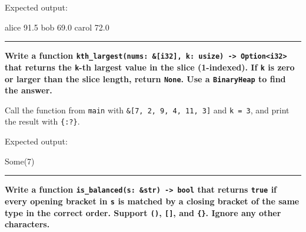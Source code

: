 \documentclass[
  11pt,
]{article}
\newenvironment{Shaded}{}{}
\newcommand{\NormalTok}[1]{#1}
\begin{document}
Expected output:

\begin{Shaded}
\begin{Highlighting}[]
\NormalTok{alice 91.5}
\NormalTok{bob 69.0}
\NormalTok{carol 72.0}
\end{Highlighting}
\end{Shaded}

\begin{Shaded}
\begin{Highlighting}[]


\end{Highlighting}
\end{Shaded}

\begin{center}\rule{0.5\linewidth}{0.5pt}\end{center}

\textbf{Write a function
\texttt{kth\_largest(nums:\ \&{[}i32{]},\ k:\ usize)\ -\textgreater{}\ Option\textless{}i32\textgreater{}}
that returns the \texttt{k}-th largest value in the slice (1-indexed).
If \texttt{k} is zero or larger than the slice length, return
\texttt{None}. Use a \texttt{BinaryHeap} to find the answer.}

Call the function from \texttt{main} with
\texttt{\&{[}7,\ 2,\ 9,\ 4,\ 11,\ 3{]}} and \texttt{k\ =\ 3}, and print
the result with \texttt{\{:?\}}.

Expected output:

\begin{Shaded}
\begin{Highlighting}[]
\NormalTok{Some(7)}
\end{Highlighting}
\end{Shaded}

\begin{Shaded}
\begin{Highlighting}[]


\end{Highlighting}
\end{Shaded}

\begin{center}\rule{0.5\linewidth}{0.5pt}\end{center}

\textbf{Write a function
\texttt{is\_balanced(s:\ \&str)\ -\textgreater{}\ bool} that returns
\texttt{true} if every opening bracket in \texttt{s} is matched by a
closing bracket of the same type in the correct order. Support
\texttt{()}, \texttt{{[}{]}}, and \texttt{\{\}}. Ignore any other
characters.}
\end{document}
